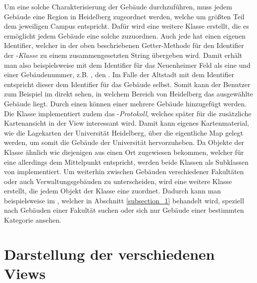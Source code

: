 \documentclass{report}
\begin{document}
\noindent Um eine solche Charakterisierung der Gebäude durchzuführen, muss jedem Gebäude eine Region in Heidelberg zugeordnet werden, welche um größten Teil dem jeweiligen Campus entspricht. Dafür wird eine weitere Klasse  erstellt, die es ermöglicht jedem Gebäude eine solche  zuzuordnen. Auch jede  hat einen eigenen Identifier, welcher in der oben beschriebenen Getter-Methode für den Identifier der -\emph{Klasse} zu einem zusammengesetzten String übergeben wird. Damit erhält man also beispielsweise mit dem Identifier  für das Neuenheimer Feld als eine  und einer Gebäudenummer, z.B. , den  . Im Falle der Altstadt mit dem Identifier  entspricht dieser dem Identifier für das Gebäude selbst. Somit kann der Benutzer zum Beispiel im  direkt sehen, in welchem Bereich von Heidelberg das ausgewählte Gebäude liegt. Durch einen  können einer  mehrere Gebäude hinzugefügt werden. Die Klasse  implementiert zudem das -\emph{Protokoll}, welches später für die zusätzliche Kartenansicht in der View interessant wird. Damit kann eigenes Kartenmaterial, wie die Lagekarten der Universität Heidelberg, über die eigentliche Map gelegt werden, um somit die Gebäude der Universität hervorzuheben. Da Objekte der Klasse  ähnlich wie diejenigen aus  einen Ort zugewiesen bekommen, welcher für eine  allerdings dem Mittelpunkt entspricht, werden beide Klassen als Subklassen von  implementiert. Um weiterhin zwischen Gebäuden verschiedener Fakultäten oder auch Verwaltungsgebäuden zu unterscheiden, wird eine weitere Klasse  erstellt, die jedem Objekt der Klasse  eine  zuordnet. Dadurch kann man beispielsweise im , welcher in Abschnitt \ref{subsection_1} behandelt wird, speziell nach Gebäuden einer Fakultät suchen oder sich nur Gebäude einer bestimmten Kategorie ansehen. 

\newpage

\section{Darstellung der verschiedenen Views}
\end{document}
